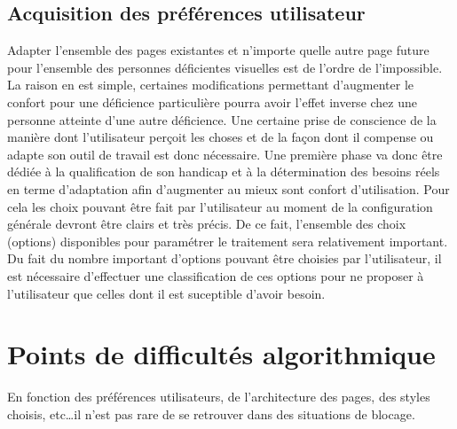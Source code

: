 \documentclass[french,a4paper]{report}
\begin{document}
{\subsection{Acquisition des préférences utilisateur}
Adapter l'ensemble des pages existantes et n'importe quelle autre
page future pour l'ensemble des personnes déficientes visuelles est
de l'ordre de l'impossible. La raison en est simple, certaines
modifications permettant d'augmenter le confort pour une déficience
particulière pourra avoir l'effet inverse chez une personne atteinte
d'une autre déficience. Une certaine prise de conscience de la
manière dont l'utilisateur perçoit les choses et de la façon dont il
compense ou adapte son outil de travail est donc nécessaire. \newline
Une première phase va donc être dédiée à la qualification de son handicap et à
la détermination des besoins réels en terme d'adaptation afin d'augmenter au
mieux sont confort d'utilisation. Pour cela les choix pouvant être fait par
l'utilisateur au moment de la configuration générale devront être clairs et très
précis. De ce fait, l'ensemble des choix (options) disponibles pour paramétrer le
traitement sera relativement important.
\\
Du fait du nombre important d'options pouvant être choisies par
l'utilisateur, il est nécessaire d'effectuer une classification de ces options
pour ne proposer à l'utilisateur que celles dont il est suceptible d'avoir
besoin.
\section{Points de difficultés algorithmique}
En fonction des préférences utilisateurs, de l'architecture des pages, des
styles choisis, etc\dots il n'est pas rare de se retrouver dans des situations de
blocage.
}
\end{document}
